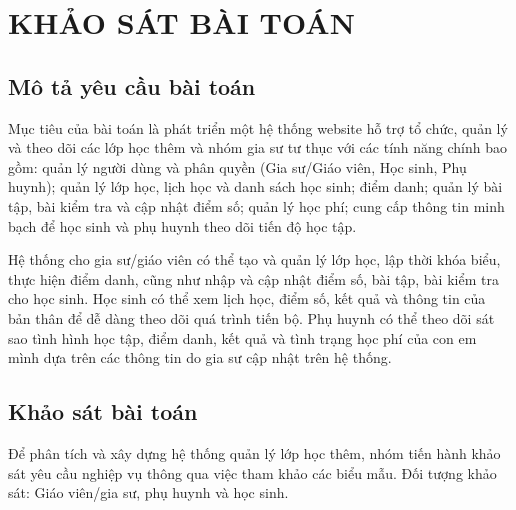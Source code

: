 \chapter{KHẢO SÁT BÀI TOÁN}
\section{Mô tả yêu cầu bài toán}
Mục tiêu của bài toán là phát triển một hệ thống website hỗ trợ tổ chức, quản lý và theo dõi các lớp học thêm và nhóm gia sư tư thục với các tính năng chính bao gồm: quản lý người dùng và phân quyền (Gia sư/Giáo viên, Học sinh, Phụ huynh); quản lý lớp học, lịch học và danh sách học sinh; điểm danh; quản lý bài tập, bài kiểm tra và cập nhật điểm số; quản lý học phí; cung cấp thông tin minh bạch để học sinh và phụ huynh theo dõi tiến độ học tập.

Hệ thống cho gia sư/giáo viên có thể tạo và quản lý lớp học, lập thời khóa biểu, thực hiện điểm danh, cũng như nhập và cập nhật điểm số, bài tập, bài kiểm tra cho học sinh. Học sinh có thể xem lịch học, điểm số, kết quả và thông tin của bản thân để dễ dàng theo dõi quá trình tiến bộ. Phụ huynh có thể theo dõi sát sao tình hình học tập, điểm danh, kết quả và tình trạng học phí của con em mình dựa trên các thông tin do gia sư cập nhật trên hệ thống.

\section{Khảo sát bài toán}
Để phân tích và xây dựng hệ thống quản lý lớp học thêm, nhóm tiến hành khảo sát yêu cầu nghiệp vụ thông qua việc tham khảo các biểu mẫu. Đối tượng khảo sát: Giáo viên/gia sư, phụ huynh và học sinh.

